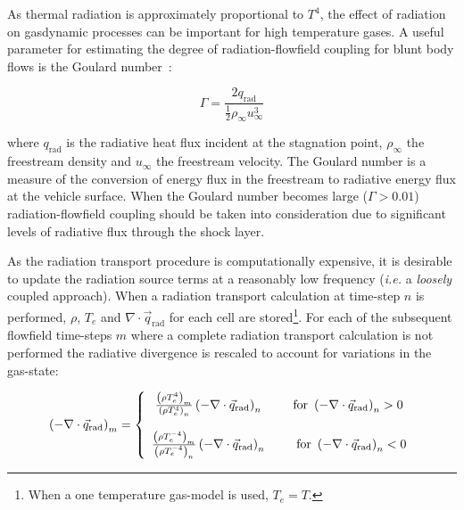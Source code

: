 As thermal radiation is approximately proportional to $T^4$, the effect of radiation on gasdynamic processes can be important for high temperature gases. 
A useful parameter for estimating the degree of radiation-flowfield coupling for blunt body flows is the Goulard number~\cite{goulard}:

\begin{equation}
 \Gamma = \frac{2 q_\text{rad}}{ \frac{1}{2} \rho_\infty u_\infty^3 }
\end{equation}

\noindent where $q_\text{rad}$ is the radiative heat flux incident at the stagnation point, $\rho_\infty$ the freestream density and $u_\infty$ the freestream velocity.
The Goulard number is a measure of the conversion of energy flux in the freestream to radiative energy flux at the vehicle surface.
When the Goulard number becomes large ($\Gamma > 0.01$) radiation-flowfield coupling should be taken into consideration due to significant levels of radiative flux through the shock layer.

\par

As the radiation transport procedure is computationally expensive, it is desirable to update the radiation source terms at a reasonably low frequency (\textit{i.e.} a \textit{loosely} coupled approach).
When a radiation transport calculation at time-step $n$ is performed, $\rho$, $T_{e}$ and $\nabla \cdot \vec{q}_\text{rad}$ for each cell are stored\footnote{When a one temperature gas-model is used, $T_e = T$.}.
For each of the subsequent flowfield time-steps $m$ where a complete radiation transport calculation is not performed the radiative divergence is rescaled to account for variations in the gas-state:

\begin{equation}
 \left ( - \nabla \cdot \vec{q}_\text{rad} \right )_m = \left \lbrace \begin{array}{c} \frac{ \left ( \rho T_{e}^{4} \right )_{m} }{ \left ( \rho T_{e}^{4} \right )_{n} } \left ( - \nabla \cdot \vec{q}_\text{rad} \right )_n \text{ \hspace{0.6cm} for } \left ( - \nabla \cdot \vec{q}_\text{rad} \right )_n > 0 \\ \\  \frac{ \left ( \rho T_{e}^{-4} \right )_{m} }{ \left ( \rho T_{e}^{-4} \right )_{n} } \left ( - \nabla \cdot \vec{q}_\text{rad} \right)_n \text{ \hspace{0.6cm} for } \left ( - \nabla \cdot \vec{q}_\text{rad} \right )_n < 0 \end{array} \right .
 \label{eq:divq_scale}
\end{equation}

